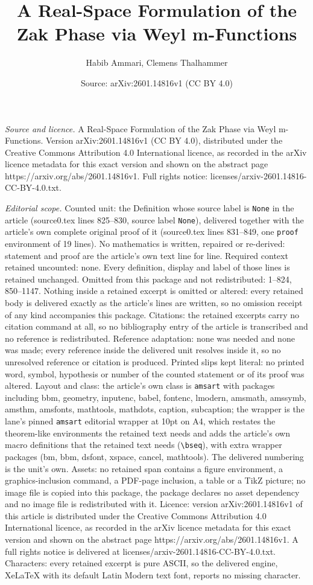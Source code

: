 \documentclass[10pt,a4paper]{amsart}
\title[A Real-Space Formulation of the Zak Phase via Weyl m-Functio]{A Real-Space Formulation of the Zak Phase via Weyl m-Functions}
\author{Habib Ammari, Clemens Thalhammer}
\date{Source: arXiv:2601.14816v1 (CC BY 4.0)}
\begin{document}
\maketitle

\noindent\emph{Source and licence.} A Real-Space Formulation of the Zak Phase via Weyl m-Functions. Version arXiv:2601.14816v1 (CC BY 4.0), distributed under the Creative Commons Attribution 4.0 International licence, as recorded in the arXiv licence metadata for this exact version and shown on the abstract page https://arxiv.org/abs/2601.14816v1. Full rights notice: licenses/arxiv-2601.14816-CC-BY-4.0.txt.\par\smallskip

\noindent\textit{Editorial scope.} Counted unit: the Definition whose source label is \texttt{None} in the article (source0.tex lines 825--830, source label \texttt{None}), delivered together with the article's own complete original proof of it (source0.tex lines 831--849, one \texttt{proof} environment of 19 lines). No mathematics is written, repaired or re-derived: statement and proof are the article's own text line for line. Required context retained uncounted: none. Every definition, display and label of those lines is retained unchanged. Omitted from this package and not redistributed: 1--824, 850--1147. Nothing inside a retained excerpt is omitted or altered: every retained body is delivered exactly as the article's lines are written, so no omission receipt of any kind accompanies this package. Citations: the retained excerpts carry no citation command at all, so no bibliography entry of the article is transcribed and no reference is redistributed. Reference adaptation: none was needed and none was made; every reference inside the delivered unit resolves inside it, so no unresolved reference or citation is produced. Printed slips kept literal: no printed word, symbol, hypothesis or number of the counted statement or of its proof was altered. Layout and class: the article's own class is \texttt{amsart} with packages including bbm, geometry, inputenc, babel, fontenc, lmodern, amsmath, amssymb, amsthm, amsfonts, mathtools, mathdots, caption, subcaption; the wrapper is the lane's pinned \texttt{amsart} editorial wrapper at 10pt on A4, which restates the theorem-like environments the retained text needs and adds the article's own macro definitions that the retained text needs (\texttt{\textbackslash bseq}), with extra wrapper packages (bm, bbm, dsfont, xspace, cancel, mathtools). The delivered numbering is the unit's own. Assets: no retained span contains a figure environment, a graphics-inclusion command, a PDF-page inclusion, a table or a TikZ picture; no image file is copied into this package, the package declares no asset dependency and no image file is redistributed with it. Licence: version arXiv:2601.14816v1 of this article is distributed under the Creative Commons Attribution 4.0 International licence, as recorded in the arXiv licence metadata for this exact version and shown on the abstract page https://arxiv.org/abs/2601.14816v1. A full rights notice is delivered at licenses/arxiv-2601.14816-CC-BY-4.0.txt. Characters: every retained excerpt is pure ASCII, so the delivered engine, XeLaTeX with its default Latin Modern text font, reports no missing character.
\end{document}
